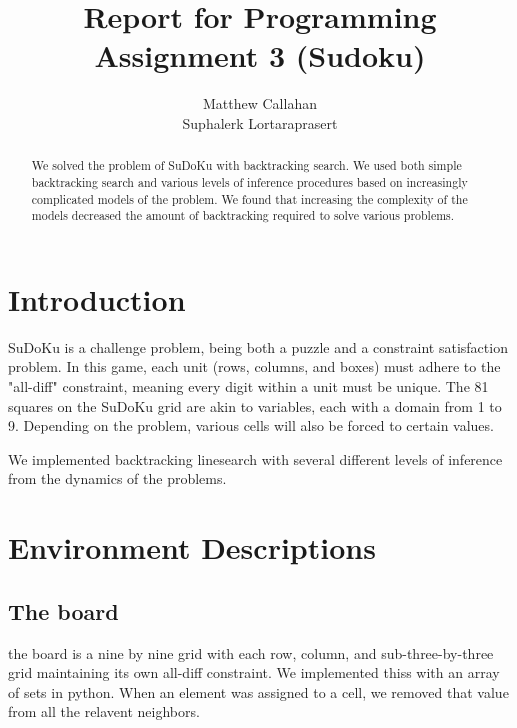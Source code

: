 \documentclass{article}
\title{Report for Programming Assignment 3 (Sudoku)}
\author{%
  Matthew Callahan\\
  \And
  Suphalerk Lortaraprasert
}
\begin{document}
\maketitle


\begin{abstract}
  We solved the problem of SuDoKu with backtracking search. We used both simple backtracking search and various levels of inference procedures based on increasingly complicated models of the problem. We found that increasing the complexity of the models decreased the amount of backtracking required to solve various problems. 
 \end{abstract}

\section{Introduction}
SuDoKu is a challenge problem, being both a puzzle and a constraint satisfaction problem. In this game, each unit (rows, columns, and boxes) must adhere to the "all-diff" constraint, meaning every digit within a unit must be unique. The 81 squares on the SuDoKu grid are akin to variables, each with a domain from 1 to 9. Depending on the problem, various cells will also be forced to certain values. 

We implemented backtracking linesearch with several different levels of inference from the dynamics of the problems. 

  
\section{Environment Descriptions}
\subsection{The board}
the board is a nine by nine grid with each row, column, and sub-three-by-three grid maintaining its own all-diff constraint. We implemented thiss with an array of sets in python. When an element was assigned to a cell, we removed that value from all the relavent neighbors. 
\end{document}
